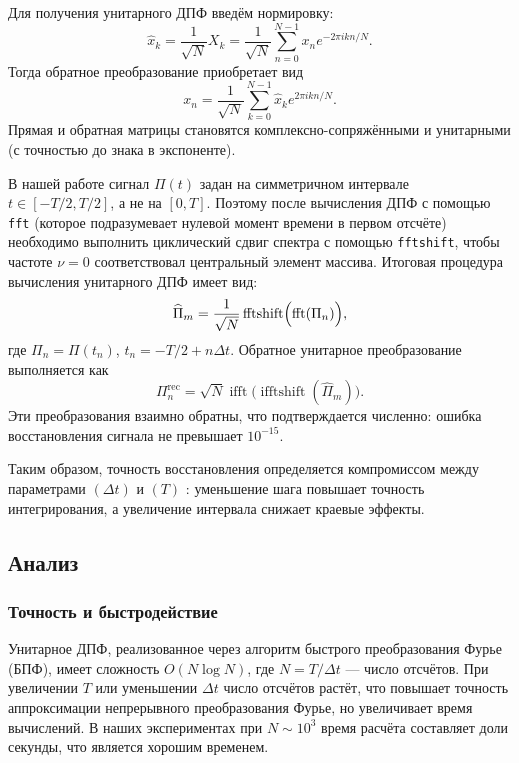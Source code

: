 \documentclass[a4paper, 12pt]{article}
\begin{document}
Для получения унитарного ДПФ введём нормировку:
\[
\hat{x}_k = \frac{1}{\sqrt{N}} X_k = \frac{1}{\sqrt{N}} \sum_{n=0}^{N-1} x_n e^{-2\pi i k n / N}.
\]
Тогда обратное преобразование приобретает вид
\[
x_n = \frac{1}{\sqrt{N}} \sum_{k=0}^{N-1} \hat{x}_k e^{2\pi i k n / N}.
\]
Прямая и обратная матрицы становятся комплексно-сопряжёнными и унитарными (с точностью до знака в экспоненте).

В нашей работе сигнал $\Pi(t)$ задан на симметричном интервале $t \in [-T/2, T/2]$, а не на $[0, T]$. Поэтому после вычисления ДПФ с помощью \texttt{fft} (которое подразумевает нулевой момент времени в первом отсчёте) необходимо выполнить циклический сдвиг спектра с помощью \texttt{fftshift}, чтобы частоте $\nu=0$ соответствовал центральный элемент массива. Итоговая процедура вычисления унитарного ДПФ имеет вид:
\[
\widehat{\Pi}_m = \frac{1}{\sqrt{N}} \operatorname{fftshift}\Bigl( \operatorname{fft}( \Pi_n ) \Bigr),
\]
где $\Pi_n = \Pi(t_n)$, $t_n = -T/2 + n\Delta t$. Обратное унитарное преобразование выполняется как
\[
\Pi_n^{\text{rec}} = \sqrt{N} \operatorname{ifft}\bigl( \operatorname{ifftshift}( \widehat{\Pi}_m ) \bigr).
\]
Эти преобразования взаимно обратны, что подтверждается численно: ошибка восстановления сигнала не превышает $10^{-15}$.


Таким образом, точность восстановления определяется компромиссом между параметрами $(\Delta t)$ и $(T)$ : уменьшение шага повышает точность интегрирования, а увеличение интервала снижает краевые эффекты.



\subsection{Анализ}
\subsubsection{Точность и быстродействие}

Унитарное ДПФ, реализованное через алгоритм быстрого преобразования Фурье (БПФ), имеет сложность $O(N \log N)$, где $N = T/\Delta t$ — число отсчётов. При увеличении $T$ или уменьшении $\Delta t$ число отсчётов растёт, что повышает точность аппроксимации непрерывного преобразования Фурье, но увеличивает время вычислений. В наших экспериментах при $N \sim 10^3$ время расчёта составляет доли секунды, что является хорошим временем.
\end{document}
